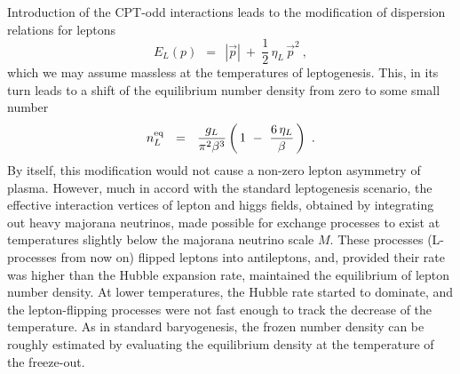 \documentclass[12pt]{revtex4}
\newcommand{\eq}{{\rm eq}}
\begin{document}
Introduction of the CPT-odd interactions leads to the modification of 
dispersion relations for leptons
\[
	E_L(p) ~~=~~ |\vec{p}| ~+~ \frac 12\, \eta_L\, \vec{p}^2~,
\]
which we may assume massless at the temperatures of leptogenesis.
This, in its turn leads to a shift of the equilibrium number density
from zero to some small number
\[
        n_L^\eq ~~=~~ \frac{g_L}{\pi^2 \beta^3}
			\left (\, 1 ~-~ \frac{6\,\eta_L}{\beta} \,\right)~.
\]
By itself, this modification would not cause a non-zero lepton asymmetry
of plasma. 
However, much in accord with the standard leptogenesis scenario, the 
effective interaction vertices of lepton and higgs fields,
obtained by integrating out heavy majorana neutrinos, made possible
for exchange processes to exist at temperatures slightly below the
majorana neutrino scale $ M $.
These processes (L-processes from now on) flipped leptons into antileptons, 
and, provided their
rate was higher than the Hubble expansion rate, maintained the equilibrium
of lepton number density.
At lower temperatures, the Hubble rate started to dominate, and the
lepton-flipping processes were not fast enough to track the decrease
of 
the temperature. 
As in standard baryogenesis, the frozen number density can be roughly
estimated by evaluating the equilibrium density at the temperature
of the freeze-out.
\end{document}
